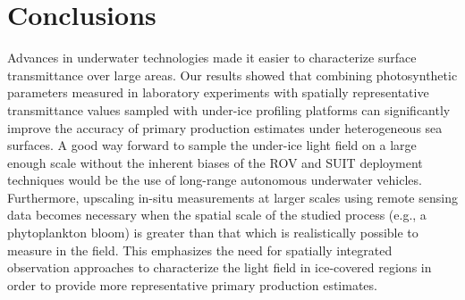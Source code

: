 \section{Conclusions}

Advances in underwater technologies made it easier to characterize surface transmittance over large areas. Our results showed that combining photosynthetic parameters measured in laboratory experiments with spatially representative transmittance values sampled with under-ice profiling platforms can significantly improve the accuracy of primary production estimates under heterogeneous sea surfaces. A good way forward to sample the under-ice light field on a large enough scale without the inherent biases of the ROV and SUIT deployment techniques would be the use of long-range autonomous underwater vehicles. Furthermore, upscaling in-situ measurements at larger scales using remote sensing data becomes necessary when the spatial scale of the studied process (e.g., a phytoplankton bloom) is greater than that which is realistically possible to measure in the field. This emphasizes the need for spatially integrated observation approaches to characterize the light field in ice-covered regions in order to provide more representative primary production estimates.
